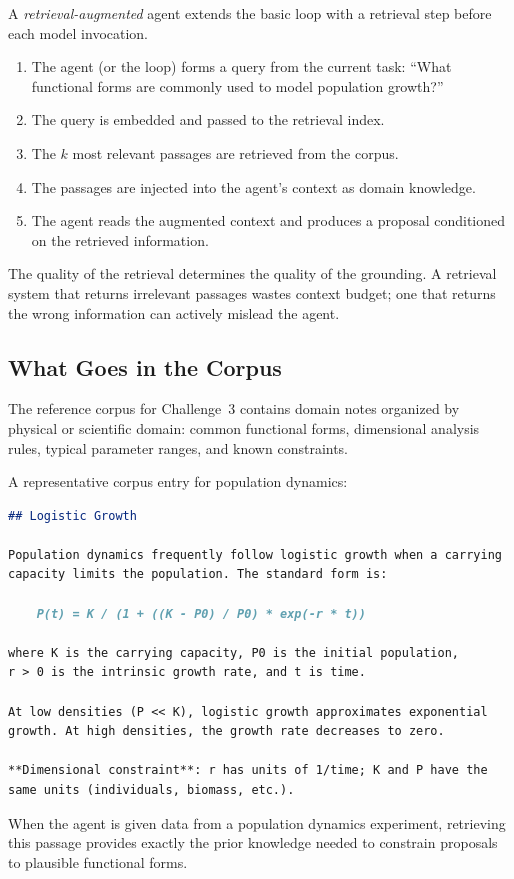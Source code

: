 A \emph{retrieval-augmented} agent extends the basic loop with a retrieval step before each model invocation.

\begin{enumerate}
\item The agent (or the loop) forms a query from the current task: ``What functional forms are commonly used to model population growth?''
\item The query is embedded and passed to the retrieval index.
\item The $k$ most relevant passages are retrieved from the corpus.
\item The passages are injected into the agent's context as domain knowledge.
\item The agent reads the augmented context and produces a proposal conditioned on the retrieved information.
\end{enumerate}

The quality of the retrieval determines the quality of the grounding.
A retrieval system that returns irrelevant passages wastes context budget; one that returns the wrong information can actively mislead the agent.

\subsection{What Goes in the Corpus}

The reference corpus for Challenge~3 contains domain notes organized by physical or scientific domain: common functional forms, dimensional analysis rules, typical parameter ranges, and known constraints.

\begin{example}
A representative corpus entry for population dynamics:
\begin{lstlisting}[language=markdown]
## Logistic Growth

Population dynamics frequently follow logistic growth when a carrying
capacity limits the population. The standard form is:

    P(t) = K / (1 + ((K - P0) / P0) * exp(-r * t))

where K is the carrying capacity, P0 is the initial population,
r > 0 is the intrinsic growth rate, and t is time.

At low densities (P << K), logistic growth approximates exponential
growth. At high densities, the growth rate decreases to zero.

**Dimensional constraint**: r has units of 1/time; K and P have the
same units (individuals, biomass, etc.).
\end{lstlisting}
When the agent is given data from a population dynamics experiment, retrieving this passage provides exactly the prior knowledge needed to constrain proposals to plausible functional forms.
\end{example}

